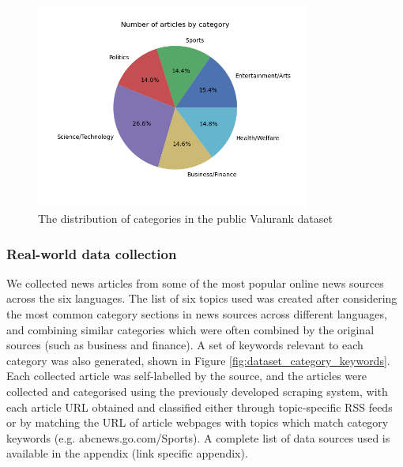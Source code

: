 \documentclass{l4proj}
\begin{document}
\begin{figure}[h]
\centering
\includegraphics[width=0.8\textwidth]{images/public-cats.png}
\caption{The distribution of categories in the public Valurank dataset}
\label{fig:public_cat_dist}
\end{figure}

\subsubsection{Real-world data collection} \hfill \par
We collected news articles from some of the most popular online news sources across the six languages. The list of six topics used was created after considering the most common category sections in news sources across different languages, and combining similar categories which were often combined by the original sources (such as business and finance). A set of keywords relevant to each category was also generated, shown in Figure \ref{fig:dataset_category_keywords}. Each collected article was self-labelled by the source, and the articles were collected and categorised using the previously developed scraping system, with each article URL obtained and classified either through topic-specific RSS feeds or by matching the URL of article webpages with topics which match category keywords (e.g. abcnews.go.com/Sports). A complete list of data sources used is available in the appendix (link specific appendix). \par
\end{document}
